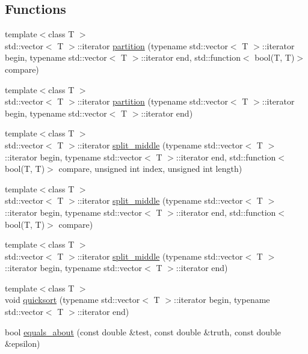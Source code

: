 \subsection*{Functions}
\begin{DoxyCompactItemize}
\item 
{\footnotesize template$<$class T $>$ }\\std\+::vector$<$ T $>$\+::iterator \hyperlink{namespaceutility_a6d97e65e822c1bbf339ed3b4125e8604}{partition} (typename std\+::vector$<$ T $>$\+::iterator begin, typename std\+::vector$<$ T $>$\+::iterator end, std\+::function$<$ bool(T, T)$>$ compare)
\item 
{\footnotesize template$<$class T $>$ }\\std\+::vector$<$ T $>$\+::iterator \hyperlink{namespaceutility_a43c3ec927ceecb5da5728af4842503e1}{partition} (typename std\+::vector$<$ T $>$\+::iterator begin, typename std\+::vector$<$ T $>$\+::iterator end)
\item 
{\footnotesize template$<$class T $>$ }\\std\+::vector$<$ T $>$\+::iterator \hyperlink{namespaceutility_a03907272fd935d20384924248438deeb}{split\+\_\+middle} (typename std\+::vector$<$ T $>$\+::iterator begin, typename std\+::vector$<$ T $>$\+::iterator end, std\+::function$<$ bool(T, T)$>$ compare, unsigned int index, unsigned int length)
\item 
{\footnotesize template$<$class T $>$ }\\std\+::vector$<$ T $>$\+::iterator \hyperlink{namespaceutility_af935837d31e0dbf78ed531fa5a9aec39}{split\+\_\+middle} (typename std\+::vector$<$ T $>$\+::iterator begin, typename std\+::vector$<$ T $>$\+::iterator end, std\+::function$<$ bool(T, T)$>$ compare)
\item 
{\footnotesize template$<$class T $>$ }\\std\+::vector$<$ T $>$\+::iterator \hyperlink{namespaceutility_a9defac790e3b7765f83f5a4b73634c5a}{split\+\_\+middle} (typename std\+::vector$<$ T $>$\+::iterator begin, typename std\+::vector$<$ T $>$\+::iterator end)
\item 
{\footnotesize template$<$class T $>$ }\\void \hyperlink{namespaceutility_a44d24bc0a4d5a6b1d919f6035ae2a5dd}{quicksort} (typename std\+::vector$<$ T $>$\+::iterator begin, typename std\+::vector$<$ T $>$\+::iterator end)
\item 
bool \hyperlink{namespaceutility_a48a4f01e19bee62fd4f16da19255abeb}{equals\+\_\+about} (const double \&test, const double \&truth, const double \&epsilon)

\end{DoxyCompactItemize}

